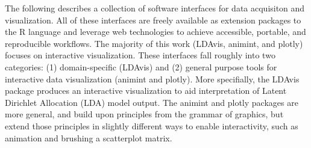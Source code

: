 
The following describes a collection of software interfaces for data acquisiton and visualization. All of these interfaces are freely available as extension packages to the R language and leverage web technologies to achieve accessible, portable, and reproducible workflows. The majority of this work (LDAvis, animint, and plotly) focuses on interactive visualization. These interfaces fall roughly into two categories: (1) domain-specific (LDAvis) and (2) general purpose tools for interactive data visualization (animint and plotly). More specifially, the LDAvis package produces an interactive visualization to aid interpretation of Latent Dirichlet Allocation (LDA) model output. The animint and plotly packages are more general, and build upon principles from the grammar of graphics, but extend those principles in slightly different ways to enable interactivity, such as animation and brushing a scatterplot matrix. 